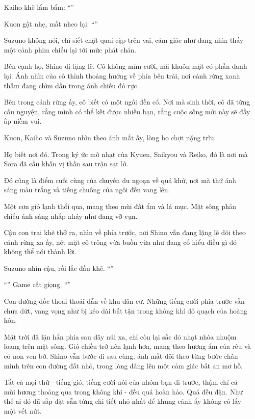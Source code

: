 \documentclass[../main.tex]{subfiles}
\begin{document}
Kaiho khẽ lẩm bẩm: ``''

Kuon gật nhẹ, mắt nheo lại: ``''

Suzuno không nói, chỉ siết chặt quai cặp trên vai, cảm giác như đang nhìn thấy một cảnh phim chiếu lại tới mức phát chán.

Bên cạnh họ, Shino đi lặng lẽ. Cô không mỉm cười, mă khuôn mặt có phần đanh lại. Ánh nhìn của cô thỉnh thoảng hướng về phía bên trái, nơi cánh rừng xanh thẫm đang chìm dần trong ánh chiều đỏ rực.

Bên trong cánh rừng ấy, cô biết có một ngôi đền cổ. Nơi mà sinh thời, cô đã từng cầu nguyện, rằng mình có thể kết được nhiều bạn, rằng cuộc sống mới này sẽ đầy ắp niềm vui.

Kuon, Kaiho và Suzuno nhìn theo ánh mắt ấy, lòng họ chợt nặng trĩu.

Họ biết nơi đó. Trong ký ức mờ nhạt của Kyuen, Saikyou và Reiko, đó là nơi mà Sora đã cầu khấn vị thần sau trận sạt lở.

Đó cũng là điểm cuối cùng của chuyến du ngoạn về quá khứ, nơi mà thứ ánh sáng màu trắng và tiếng chuông của ngôi đền vang lên.

Một cơn gió lạnh thổi qua, mang theo mùi đất ẩm và lá mục. Mặt sông phản chiếu ánh sáng nhấp nháy như đang vỡ vụn.

Cậu con trai khẽ thở ra, nhìn về phía trước, nơi Shino vẫn đang lặng lẽ dõi theo cánh rừng xa ấy, nét mặt cô trông vừa buồn vừa như đang cố hiểu điều gì đó không thể nói thành lời.

Suzuno nhìn cậu, rồi lắc đầu khẽ. ``''

``'' Game cất giọng. ``''

Con đường dốc thoai thoải dẫn về khu dân cư. Những tiếng cười phía trước vẫn chưa dứt, vang vọng như bị kéo dài bất tận trong không khí đỏ quạch của hoàng hôn.

Mặt trời đã lặn hẳn phía sau dãy núi xa, chỉ còn lại sắc đỏ nhạt nhòa nhuộm loang trên mặt sông. Gió chiều trở nên lạnh hơn, mang theo hương ẩm của rêu và cỏ non ven bờ. Shino vẫn bước đi sau cùng, ánh mắt dõi theo từng bước chân mình trên con đường đất nhỏ, trong lòng dâng lên một cảm giác bất an mơ hồ.

Tất cả mọi thứ - tiếng gió, tiếng cười nói của nhóm bạn đi trước, thậm chí cả mùi hương thoảng qua trong không khí - đều quá hoàn hảo. Quá đều đặn. Như thể ai đó đã sắp đặt sẵn từng chi tiết nhỏ nhất để khung cảnh ấy không có lấy một vết nứt.
\end{document}
